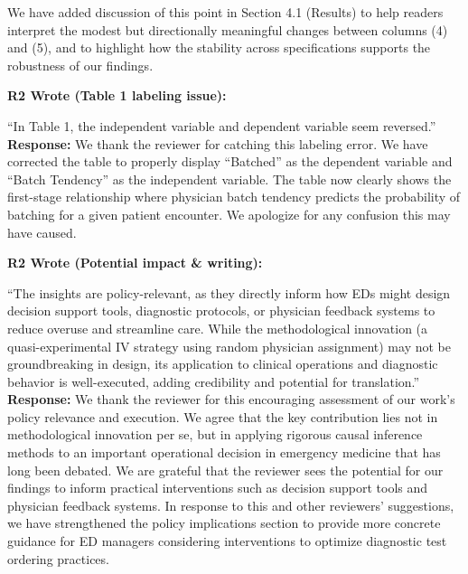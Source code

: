 \documentclass[11pt]{article}
\newenvironment{quote2}
{ \bigskip
\noindent
         \small\em
         \baselineskip=14pt
}
\newcommand{\1}{\hbox{\rm 1\kern-.35em 1}}
\begin{document}
We have added discussion of this point in Section 4.1 (Results) to help readers interpret the modest but directionally meaningful changes between columns (4) and (5), and to highlight how the stability across specifications supports the robustness of our findings.

\color{black}

\begin{quote2}
\textbf{R2 Wrote (Table 1 labeling issue):}  

\noindent``In Table 1, the independent variable and dependent variable seem reversed.''
\end{quote2}

\noindent\textbf{Response:} \color{blue}
We thank the reviewer for catching this labeling error. We have corrected the table to properly display ``Batched'' as the dependent variable and ``Batch Tendency'' as the independent variable. The table now clearly shows the first-stage relationship where physician batch tendency predicts the probability of batching for a given patient encounter. We apologize for any confusion this may have caused.
\color{black}

\begin{quote2}
\textbf{R2 Wrote (Potential impact \& writing):}  

\noindent``The insights are policy-relevant, as they directly inform how EDs might design decision support tools, diagnostic protocols, or physician feedback systems to reduce overuse and streamline care. While the methodological innovation (a quasi-experimental IV strategy using random physician assignment) may not be groundbreaking in design, its application to clinical operations and diagnostic behavior is well-executed, adding credibility and potential for translation.''
\end{quote2}

\noindent\textbf{Response:} \color{blue}
We thank the reviewer for this encouraging assessment of our work's policy relevance and execution. We agree that the key contribution lies not in methodological innovation per se, but in applying rigorous causal inference methods to an important operational decision in emergency medicine that has long been debated. We are grateful that the reviewer sees the potential for our findings to inform practical interventions such as decision support tools and physician feedback systems. In response to this and other reviewers' suggestions, we have strengthened the policy implications section to provide more concrete guidance for ED managers considering interventions to optimize diagnostic test ordering practices.
\color{black}
\end{document}
